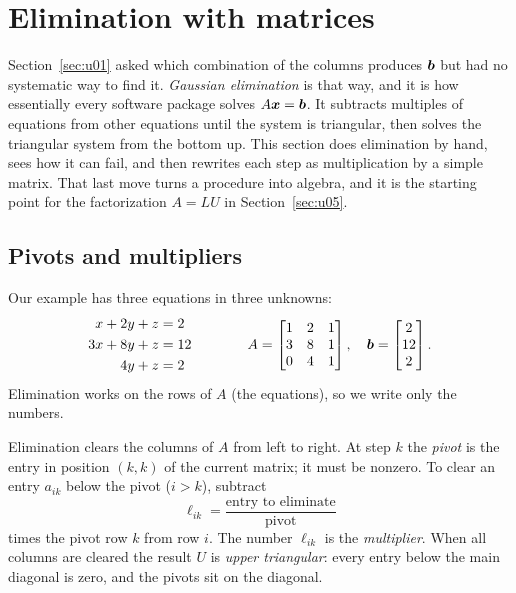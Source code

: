 \section{Elimination with matrices}\label{sec:u03}

Section~\ref{sec:u01} asked which combination of the columns produces $\boldsymbol{b}$ but had no
systematic way to find it. \emph{Gaussian elimination} is that way, and it is how essentially
every software package solves $A\boldsymbol{x}=\boldsymbol{b}$. It subtracts multiples of equations from
other equations until the system is triangular, then solves the triangular system from the
bottom up. This section does elimination by hand, sees how it can fail, and then rewrites
each step as multiplication by a simple matrix. That last move turns a procedure into
algebra, and it is the starting point for the factorization $A=LU$ in Section~\ref{sec:u05}.

\subsection{Pivots and multipliers}

Our example has three equations in three unknowns:
\begin{equation}\label{eq:u03-system}
\begin{aligned}
  x + 2y + z &= 2\\
  3x + 8y + z &= 12\\
  4y + z &= 2
\end{aligned}
\qquad\qquad
A=\begin{bmatrix} 1 & 2 & 1\\ 3 & 8 & 1\\ 0 & 4 & 1\end{bmatrix},\quad
\boldsymbol{b}=\begin{bmatrix} 2\\ 12\\ 2\end{bmatrix}.
\end{equation}
Elimination works on the rows of $A$ (the equations), so we write only the numbers.

\begin{definition}\label{def:u03-pivot}
Elimination clears the columns of $A$ from left to right. At step $k$ the \emph{pivot} is the
entry in position $(k,k)$ of the current matrix; it must be nonzero. To clear an entry
$a_{ik}$ below the pivot ($i>k$), subtract
\[
  \ell_{ik} = \frac{\text{entry to eliminate}}{\text{pivot}}
\]
times the pivot row $k$ from row $i$. The number $\ell_{ik}$ is the \emph{multiplier}. When
all columns are cleared the result $U$ is \emph{upper triangular}: every entry below the main
diagonal is zero, and the pivots sit on the diagonal.
\end{definition}

